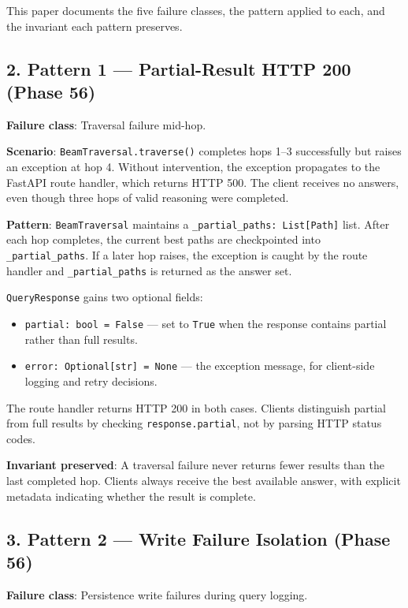 This paper documents the five failure classes, the pattern applied to each, and the invariant each pattern preserves.

\subsection*{2. Pattern 1 --- Partial-Result HTTP 200 (Phase 56)}

\textbf{Failure class}: Traversal failure mid-hop.

\textbf{Scenario}: \texttt{BeamTraversal.traverse()} completes hops 1--3 successfully but raises an exception at hop 4. Without intervention, the exception propagates to the FastAPI route handler, which returns HTTP 500. The client receives no answers, even though three hops of valid reasoning were completed.

\textbf{Pattern}: \texttt{BeamTraversal} maintains a \texttt{\_partial\_paths: List[Path]} list. After each hop completes, the current best paths are checkpointed into \texttt{\_partial\_paths}. If a later hop raises, the exception is caught by the route handler and \texttt{\_partial\_paths} is returned as the answer set.

\texttt{QueryResponse} gains two optional fields:
\begin{itemize}
  \item \texttt{partial: bool = False} --- set to \texttt{True} when the response contains partial rather than full results.
  \item \texttt{error: Optional[str] = None} --- the exception message, for client-side logging and retry decisions.
\end{itemize}


The route handler returns HTTP 200 in both cases. Clients distinguish partial from full results by checking \texttt{response.partial}, not by parsing HTTP status codes.

\textbf{Invariant preserved}: A traversal failure never returns fewer results than the last completed hop. Clients always receive the best available answer, with explicit metadata indicating whether the result is complete.

\subsection*{3. Pattern 2 --- Write Failure Isolation (Phase 56)}

\textbf{Failure class}: Persistence write failures during query logging.

